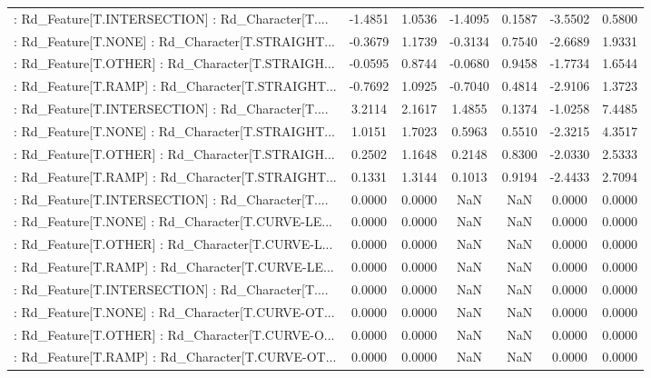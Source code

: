 \begin{longtable}{p{4cm}cccccc}
 : Rd\_Feature[T.INTERSECTION] : Rd\_Character[T.... & -1.4851 &    1.0536 & -1.4095 &       0.1587 & -3.5502 &  0.5800 \\
 : Rd\_Feature[T.NONE] : Rd\_Character[T.STRAIGHT... & -0.3679 &    1.1739 & -0.3134 &       0.7540 & -2.6689 &  1.9331 \\
 : Rd\_Feature[T.OTHER] : Rd\_Character[T.STRAIGH... & -0.0595 &    0.8744 & -0.0680 &       0.9458 & -1.7734 &  1.6544 \\
 : Rd\_Feature[T.RAMP] : Rd\_Character[T.STRAIGHT... & -0.7692 &    1.0925 & -0.7040 &       0.4814 & -2.9106 &  1.3723 \\
 : Rd\_Feature[T.INTERSECTION] : Rd\_Character[T.... &  3.2114 &    2.1617 &  1.4855 &       0.1374 & -1.0258 &  7.4485 \\
 : Rd\_Feature[T.NONE] : Rd\_Character[T.STRAIGHT... &  1.0151 &    1.7023 &  0.5963 &       0.5510 & -2.3215 &  4.3517 \\
 : Rd\_Feature[T.OTHER] : Rd\_Character[T.STRAIGH... &  0.2502 &    1.1648 &  0.2148 &       0.8300 & -2.0330 &  2.5333 \\
 : Rd\_Feature[T.RAMP] : Rd\_Character[T.STRAIGHT... &  0.1331 &    1.3144 &  0.1013 &       0.9194 & -2.4433 &  2.7094 \\
 : Rd\_Feature[T.INTERSECTION] : Rd\_Character[T.... &  0.0000 &    0.0000 &     NaN &          NaN &  0.0000 &  0.0000 \\
 : Rd\_Feature[T.NONE] : Rd\_Character[T.CURVE-LE... &  0.0000 &    0.0000 &     NaN &          NaN &  0.0000 &  0.0000 \\
 : Rd\_Feature[T.OTHER] : Rd\_Character[T.CURVE-L... &  0.0000 &    0.0000 &     NaN &          NaN &  0.0000 &  0.0000 \\
 : Rd\_Feature[T.RAMP] : Rd\_Character[T.CURVE-LE... &  0.0000 &    0.0000 &     NaN &          NaN &  0.0000 &  0.0000 \\
 : Rd\_Feature[T.INTERSECTION] : Rd\_Character[T.... &  0.0000 &    0.0000 &     NaN &          NaN &  0.0000 &  0.0000 \\
 : Rd\_Feature[T.NONE] : Rd\_Character[T.CURVE-OT... &  0.0000 &    0.0000 &     NaN &          NaN &  0.0000 &  0.0000 \\
 : Rd\_Feature[T.OTHER] : Rd\_Character[T.CURVE-O... &  0.0000 &    0.0000 &     NaN &          NaN &  0.0000 &  0.0000 \\
 : Rd\_Feature[T.RAMP] : Rd\_Character[T.CURVE-OT... &  0.0000 &    0.0000 &     NaN &          NaN &  0.0000 &  0.0000 \\

\end{longtable}
